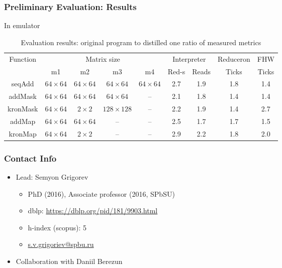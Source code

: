 \documentclass[xcolor=table,aspectratio=169]{beamer}
\begin{document}
\begin{frame}[fragile]
  \frametitle{Preliminary Evaluation: Results}
  In emulator
  \begin{table}
    \centering    
    \begin{tabular}{|c|c|c|c|c||c|c|c|c|}
        \hline
        \multirow{2}{*}{Function} &  \multicolumn{4}{c||}{Matrix size}  & \multicolumn{2}{c|}{Interpreter}            & Reduceron & FHW\\
        \cline{2-9}
                                  &   m1 & m2 & m3 & m4                & Red-s & Reads                               & Ticks     & Ticks \\
        \hline
        seqAdd   & $64 \times 64$ & $64 \times 64$ & $64 \times 64$ & $64 \times 64$ & 2.7          & 1.9        & 1.8 & 1.4  \\ 
        addMask  & $64 \times 64$ & $64 \times 64$ & $64 \times 64$ & --             & 2.1          & 1.8        & 1.4 & 1.4  \\ 
        kronMask & $64 \times 64$ & $2 \times 2$   &$128 \times 128$& --             & 2.2          & 1.9        & 1.4 & 2.7  \\ 
        addMap   & $64 \times 64$ & $64 \times 64$ & --             & --             & 2.5          & 1.7        & 1.7 & 1.5  \\
        kronMap  & $64 \times 64$ & $2 \times 2$   & --             & --             & 2.9          & 2.2        & 1.8 & 2.0  \\ 
        \hline
        
    \end{tabular}
    \caption{Evaluation results: original program to distilled one ratio of measured metrics}
    \label{tbl:evaluationResults}
  \end{table} 
\end{frame}


\begin{frame}[fragile]
  \frametitle{Contact Info}  
  \begin{itemize}      
      \item Lead: Semyon Grigorev      
      \begin{itemize}
        \item PhD (2016), Associate professor (2016, SPbSU)
        \item dblp: \href{https://dblp.org/pid/181/9903.html}{https://dblp.org/pid/181/9903.html}
        \item h-index (scopus): 5
        \item \href{s.v.grigoriev@spbu.ru}{s.v.grigoriev@spbu.ru}
      \end{itemize}
      \item Collaboration with Daniil Berezun      
    \end{itemize}
\end{frame}
\end{document}
